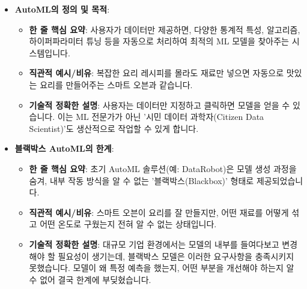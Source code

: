 \documentclass[11pt,a4paper]{article}
\begin{document}
\begin{itemize}
    \item \textbf{AutoML의 정의 및 목적}:
    \begin{itemize}
        \item \textbf{한 줄 핵심 요약}: 사용자가 데이터만 제공하면, 다양한 통계적 특성, 알고리즘, 하이퍼파라미터 튜닝 등을 자동으로 처리하여 최적의 ML 모델을 찾아주는 시스템입니다.
        \item \textbf{직관적 예시/비유}: 복잡한 요리 레시피를 몰라도 재료만 넣으면 자동으로 맛있는 요리를 만들어주는 스마트 오븐과 같습니다.
        \item \textbf{기술적 정확한 설명}: 사용자는 데이터만 지정하고 클릭하면 모델을 얻을 수 있습니다. 이는 ML 전문가가 아닌 '시민 데이터 과학자(Citizen Data Scientist)'도 생산적으로 작업할 수 있게 합니다.
    \end{itemize}

    \item \textbf{블랙박스 AutoML의 한계}:
    \begin{itemize}
        \item \textbf{한 줄 핵심 요약}: 초기 AutoML 솔루션(예: DataRobot)은 모델 생성 과정을 숨겨, 내부 작동 방식을 알 수 없는 '블랙박스(Blackbox)' 형태로 제공되었습니다.
        \item \textbf{직관적 예시/비유}: 스마트 오븐이 요리를 잘 만들지만, 어떤 재료를 어떻게 섞고 어떤 온도로 구웠는지 전혀 알 수 없는 상태입니다.
        \item \textbf{기술적 정확한 설명}: 대규모 기업 환경에서는 모델의 내부를 들여다보고 변경해야 할 필요성이 생기는데, 블랙박스 모델은 이러한 요구사항을 충족시키지 못했습니다. 모델이 왜 특정 예측을 했는지, 어떤 부분을 개선해야 하는지 알 수 없어 결국 한계에 부딪혔습니다.
    \end{itemize}


\end{itemize}
\end{document}
